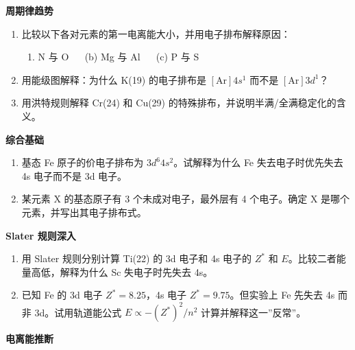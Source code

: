 \textbf{周期律趋势}

\begin{enumerate}
\def\labelenumi{\arabic{enumi}.}
\setcounter{enumi}{8}
\item
  比较以下各对元素的第一电离能大小，并用电子排布解释原因：

  \begin{enumerate}
  \def\labelenumii{(\alph{enumii})}
  \tightlist
  \item
    N 与 O   (b) Mg 与 Al   (c) P 与 S
  \end{enumerate}
\item
  用能级图解释：为什么 K(19) 的电子排布是 \([\mathrm{Ar}]4s^1\) 而不是 \([\mathrm{Ar}]3d^1\)？
\item
  用洪特规则解释 Cr(24) 和 Cu(29) 的特殊排布，并说明半满/全满稳定化的含义。
\end{enumerate}

\textbf{综合基础}

\begin{enumerate}
\def\labelenumi{\arabic{enumi}.}
\setcounter{enumi}{11}
\item
  基态 Fe 原子的价电子排布为 \(3d^6 4s^2\)。试解释为什么 Fe 失去电子时优先失去 4s 电子而不是 3d 电子。
\item
  某元素 X 的基态原子有 3 个未成对电子，最外层有 4 个电子。确定 X 是哪个元素，并写出其电子排布式。
\end{enumerate}

\textbf{Slater 规则深入}

\begin{enumerate}
\def\labelenumi{\arabic{enumi}.}
\setcounter{enumi}{13}
\item
  用 Slater 规则分别计算 Ti(22) 的 3d 电子和 4s 电子的 \(Z^*\) 和 \(E\)。比较二者能量高低，解释为什么 Sc 失电子时先失去 4s。
\item
  已知 Fe 的 3d 电子 \(Z^* = 8.25\)，4s 电子 \(Z^* = 9.75\)。但实验上 Fe 先失去 4s 而非 3d。试用轨道能公式 \(E \propto -(Z^*)^2/n^2\) 计算并解释这一''反常''。
\end{enumerate}

\textbf{电离能推断}

